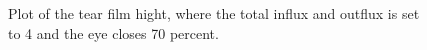 \begin{figure}
	\caption{Plot of the tear film hight, where the total influx and outflux is set to 4 and the eye closes 70 percent.}
	\label{broken_tears}
\end{figure}










